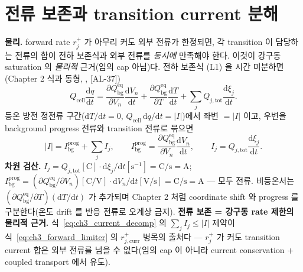 \documentclass[11pt,a4paper]{article}
\newcommand{\dd}{\mathrm{d}}
\newcommand{\eq}{\mathrm{eq}}
\newcommand{\bg}{\mathrm{bg}}
\newcommand{\cell}{\mathrm{cell}}
\newcommand{\tot}{\mathrm{tot}}
\newcommand{\curr}{\mathrm{curr}}
\newcommand{\AL}[1]{\textsf{[AL-#1]}}
\begin{document}
\section{전류 보존과 transition current 분해}\label{sec:ch3_current}
\textbf{물리.} forward rate $r_j^+$ 가 아무리 커도 외부 전류가 한정되면, 각 transition 이 담당하는 전류의 합이
전하 보존식과 외부 전류를 \emph{동시에} 만족해야 한다. 이것이 강구동 saturation 의 \emph{물리적} 근거(임의 cap
아님)다. 전하 보존식 (L1) 을 시간 미분하면(Chapter 2 식과 동형, \cite{doyle1993}, \AL{37})
\begin{equation}
Q_\cell\frac{\dd q}{\dd t}=\frac{\partial Q_\bg^{\eq}}{\partial V_n}\frac{\dd V_n}{\dd t}+\frac{\partial Q_\bg^{\eq}}{\partial T}\frac{\dd T}{\dd t}+\sum_j Q_{j,\tot}\frac{\dd\xi_j}{\dd t}.
\label{eq:ch3_current_balance}
\end{equation}
등온 방전 정전류 구간($\dd T/\dd t=0$, $Q_\cell\,\dd q/\dd t=|I|$)에서 좌변 $=|I|$ 이고, 우변을 background
progress 전류와 transition 전류로 묶으면
\begin{equation}
|I|=I_\bg^{\mathrm{prog}}+\sum_j I_j,\qquad I_\bg^{\mathrm{prog}}=\frac{\partial Q_\bg^{\eq}}{\partial V_n}\frac{\dd V_n}{\dd t},\qquad I_j=Q_{j,\tot}\frac{\dd\xi_j}{\dd t}.
\label{eq:ch3_current_decomp}
\end{equation}
\textbf{차원 검산.} $I_j=Q_{j,\tot}[\mathrm C]\cdot\dd\xi_j/\dd t[\mathrm{s^{-1}}]=\mathrm{C/s}=\mathrm A$;
$I_\bg^{\mathrm{prog}}=(\partial Q_\bg^{\eq}/\partial V_n)[\mathrm{C/V}]\cdot\dd V_n/\dd t[\mathrm{V/s}]=\mathrm{C/s}=\mathrm A$
— 모두 전류. 비등온서는 $(\partial Q_\bg^{\eq}/\partial T)(\dd T/\dd t)$ 가 추가되며 Chapter 2 처럼 coordinate shift
와 progress 를 구분한다(온도 drift 를 반응 전류로 오계상 금지).
\textbf{전류 보존 = 강구동 rate 제한의 물리적 근거.} 식~\eqref{eq:ch3_current_decomp} 의 $\sum_j I_j\le|I|$
제약이 식~\eqref{eq:ch3_forward_limiter} 의 $r_{j,\curr}^+$ 병목의 출처다 — $r_j^+$ 가 커도 transition current
합은 외부 전류를 넘을 수 없다(임의 cap 이 아니라 current conservation + coupled transport 에서 유도).

\end{document}
